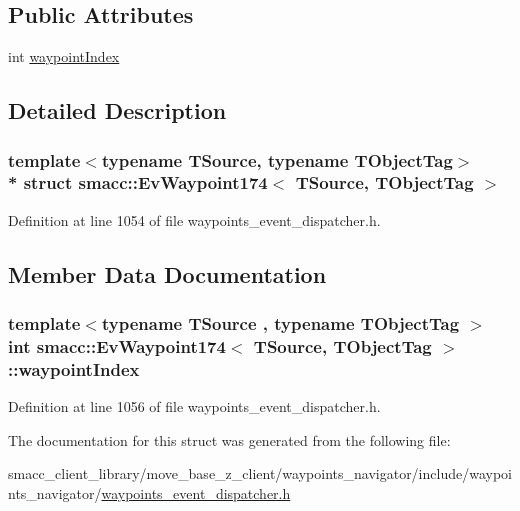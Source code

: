 \subsection*{Public Attributes}
\begin{DoxyCompactItemize}
\item 
int \hyperlink{structsmacc_1_1EvWaypoint174_a92e262c953edf0d4e389f7e5e0ca2e4e}{waypoint\+Index}
\end{DoxyCompactItemize}


\subsection{Detailed Description}
\subsubsection*{template$<$typename T\+Source, typename T\+Object\+Tag$>$\\*
struct smacc\+::\+Ev\+Waypoint174$<$ T\+Source, T\+Object\+Tag $>$}



Definition at line 1054 of file waypoints\+\_\+event\+\_\+dispatcher.\+h.



\subsection{Member Data Documentation}
\subsubsection[{\texorpdfstring{waypoint\+Index}{waypointIndex}}]{\setlength{\rightskip}{0pt plus 5cm}template$<$typename T\+Source , typename T\+Object\+Tag $>$ int {\bf smacc\+::\+Ev\+Waypoint174}$<$ T\+Source, T\+Object\+Tag $>$\+::waypoint\+Index}\hypertarget{structsmacc_1_1EvWaypoint174_a92e262c953edf0d4e389f7e5e0ca2e4e}{}\label{structsmacc_1_1EvWaypoint174_a92e262c953edf0d4e389f7e5e0ca2e4e}


Definition at line 1056 of file waypoints\+\_\+event\+\_\+dispatcher.\+h.



The documentation for this struct was generated from the following file\+:\begin{DoxyCompactItemize}
\item 
smacc\+\_\+client\+\_\+library/move\+\_\+base\+\_\+z\+\_\+client/waypoints\+\_\+navigator/include/waypoints\+\_\+navigator/\hyperlink{waypoints__event__dispatcher_8h}{waypoints\+\_\+event\+\_\+dispatcher.\+h}\end{DoxyCompactItemize}
